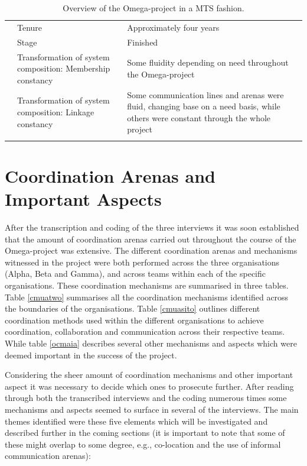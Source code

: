 \begin{center}
\begin{longtable}{ | p{2.25cm} | p{2.25cm} | p{6.5cm} | }
	& Tenure & Approximately four years \\ \cline{2-3}
	& Stage & Finished \\ \cline{2-3}
	& Transformation of system composition: Membership constancy & Some fluidity depending on need throughout the Omega-project \\ \cline{2-3}
	& Transformation of system composition: Linkage constancy & Some communication lines and arenas were fluid, changing base on a need basis, while others were constant through the whole project \\ \cline{2-3}
	\hline
\caption{Overview of the Omega-project in a MTS fashion.}
\label{ootopiamf}
\end{longtable}
\end{center}

\section{Coordination Arenas and Important Aspects}

After the transcription and coding of the three interviews it was soon established that the amount of coordination arenas carried out throughout the course of the Omega-project was extensive. The different coordination arenas and mechanisms witnessed in the project were both performed across the three organisations (Alpha, Beta and Gamma), and across teams within each of the specific organisations. These coordination mechanisms are summarised in three tables. Table \ref{cmuatwo} summarises all the coordination mechanisms identified across the boundaries of the organisations. Table \ref{cmuasito} outlines different coordination methods used within the different organisations to achieve coordination, collaboration and communication across their respective teams. While table \ref{ocmaia} describes several other mechanisms and aspects which were deemed important in the success of the project.

Considering the sheer amount of coordination mechanisms and other important aspect it was necessary to decide which ones to prosecute further. After reading through both the transcribed interviews and the coding numerous times some mechanisms and aspects seemed to surface in several of the interviews. The main themes identified were these five elements which will be investigated and described further in the coming sections (it is important to note that some of these might overlap to some degree, e.g., co-location and the use of informal communication arenas):

